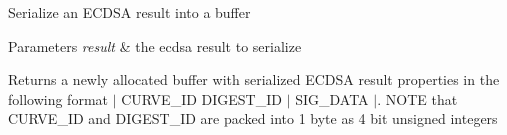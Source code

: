Serialize an E\+C\+D\+SA result into a buffer


\begin{DoxyParams}{Parameters}
{\em result} & the ecdsa result to serialize \\
\hline
\end{DoxyParams}
\begin{DoxyReturn}{Returns}
a newly allocated buffer with serialized E\+C\+D\+SA result properties in the following format $\vert$ C\+U\+R\+V\+E\+\_\+\+ID D\+I\+G\+E\+S\+T\+\_\+\+ID $\vert$ S\+I\+G\+\_\+\+D\+A\+TA $\vert$. N\+O\+TE that C\+U\+R\+V\+E\+\_\+\+ID and D\+I\+G\+E\+S\+T\+\_\+\+ID are packed into 1 byte as 4 bit unsigned integers 
\end{DoxyReturn}
